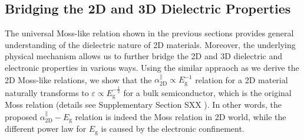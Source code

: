 \documentclass[journal=ancac3,manuscript=article,email=true,hyperref=true,keywords=false]{achemso}
\begin{document}
\subsection{Bridging the 2D and 3D Dielectric Properties}
\label{sec:2D-3D}

The universal Moss-like relation shown in the previous sections
provides general understanding of the dielectric nature of 2D
materials. Moreover, the underlying physical mechanism allows us to
further bridge the 2D and 3D dielectric and electronic properties in
various ways. Using the similar appraoch as we derive the 2D Moss-like
relations, we show that the
$\alpha_{\mathrm{2D}}^{\parallel} \propto E_{\mathrm{g}}^{-1}$
relation for a 2D material naturally transforms to
$\varepsilon \propto E_{\mathrm{g}}^{-\frac{1}{2}}$ for a bulk
semiconductor, which is the original Moss relation (details see
Supplementary Section SXX ). In other words, the proposed
$\alpha_{\mathrm{2D}}^{\parallel}-E_{\mathrm{g}}$ relation is indeed
the Moss relation in 2D world, while the different power law for
$E_{\mathrm{g}}$ is caused by the electronic confinement.

\end{document}
